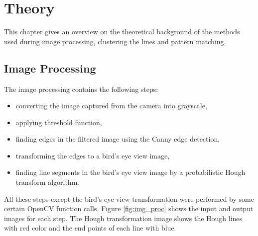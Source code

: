 \documentclass[Report.tex]{subfiles}
\begin{document}
\chapter{Theory}
This chapter gives an overview on the theoretical background of the
methods used during image processing, clustering the lines and pattern matching.
\label{chapter:Theory}

\section{Image Processing} %
\label{sec:Image Processing}
The image processing contains the following steps:
\begin{itemize}
  \item converting the image captured from the camera into grayscale,
  \item applying threshold function,
  \item finding edges in the filtered image using the Canny edge detection,
  \item transforming the edges to a bird's eye view image,
  \item finding line segments in the bird's eye view image by a
    probabilistic Hough transform algorithm.
\end{itemize}
All these steps except the bird's eye view transformation were performed by some certain
OpenCV\cite{www:opencv} function calls. Figure \ref{fig:img_proc} shows the input and output
images for each step. The Hough transformation image shows the Hough lines with
red color and the end points of each line with blue.
\end{document}
